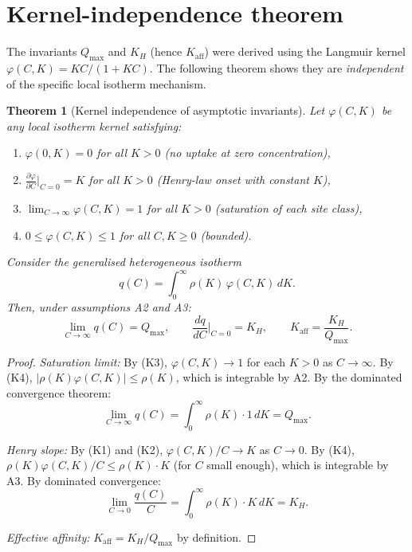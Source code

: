 \documentclass[12pt]{article}
\newtheorem{theorem}{Theorem}
\begin{document}
\section{Kernel-independence theorem}
\label{sec:kernel}

The invariants $Q_{\max}$ and $K_H$ (hence $K_{\mathrm{aff}}$) were
derived using the Langmuir kernel $\varphi(C,K)=KC/(1+KC)$.
The following theorem shows they are \emph{independent} of the
specific local isotherm mechanism.

\begin{theorem}[Kernel independence of asymptotic invariants]
\label{thm:kernel}
Let $\varphi(C,K)$ be \emph{any} local isotherm kernel satisfying:
\begin{enumerate}[nosep]
  \item[(K1)] $\varphi(0,K)=0$ for all $K>0$
        \quad (no uptake at zero concentration),
  \item[(K2)] $\displaystyle\frac{\partial\varphi}{\partial C}
        \bigg|_{C=0}=K$ for all $K>0$
        \quad (Henry-law onset with constant $K$),
  \item[(K3)] $\displaystyle\lim_{C\to\infty}\varphi(C,K)=1$
        for all $K>0$
        \quad (saturation of each site class),
  \item[(K4)] $0\le\varphi(C,K)\le 1$ for all $C,K\ge 0$
        \quad (bounded).
\end{enumerate}
Consider the generalised heterogeneous isotherm
\begin{equation}
  q(C)=\int_0^\infty\rho(K)\,\varphi(C,K)\,dK.
  \label{eq:general_kernel}
\end{equation}
Then, under assumptions A2 and A3:
\begin{equation}
  \lim_{C\to\infty}q(C)=Q_{\max},\qquad
  \frac{dq}{dC}\bigg|_{C=0}=K_H,\qquad
  K_{\mathrm{aff}}=\frac{K_H}{Q_{\max}}.
  \label{eq:kernel_indep}
\end{equation}
\end{theorem}

\begin{proof}
\textit{Saturation limit:}
By (K3), $\varphi(C,K)\to 1$ for each $K>0$ as $C\to\infty$.
By (K4), $|\rho(K)\varphi(C,K)|\le\rho(K)$, which is integrable by
A2.  By the dominated convergence theorem:
\[
  \lim_{C\to\infty}q(C) = \int_0^\infty \rho(K)\cdot 1\,dK
  = Q_{\max}.
\]

\textit{Henry slope:}
By (K1) and (K2), $\varphi(C,K)/C\to K$ as $C\to 0$.
By (K4), $\rho(K)\varphi(C,K)/C\le\rho(K)\cdot K$ (for $C$
small enough), which is integrable by A3.  By dominated convergence:
\[
  \lim_{C\to 0}\frac{q(C)}{C}
  = \int_0^\infty \rho(K)\cdot K\,dK = K_H.
\]

\textit{Effective affinity:}
$K_{\mathrm{aff}}=K_H/Q_{\max}$ by definition.
\end{proof}
\end{document}
